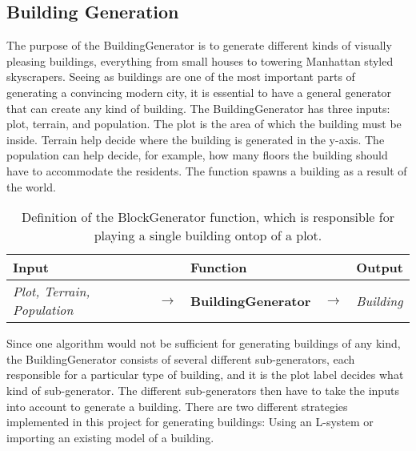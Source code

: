 \subsection{Building Generation}
The purpose of the BuildingGenerator is to generate different kinds of visually pleasing buildings, everything from small houses to towering Manhattan styled skyscrapers. 
Seeing as buildings are one of the most important parts of generating a convincing modern city, it is essential to have a general generator that can create any kind of building. 
The BuildingGenerator has three inputs: plot, terrain, and population. 
The plot is the area of which the building must be inside.
Terrain help decide where the building is generated in the y-axis. 
The population can help decide, for example, how many floors the building should have to accommodate the residents. 
The function spawns a building as a result of the world. 

\begin{table}[H]
    \centering
    \begin{tabular}{lllll}
      \textbf{Input}                           &               & \textbf{Function}            &               & \textbf{Output}         \\
      \midrule
      \textit{Plot, Terrain, Population}       & $\rightarrow$ & \textbf{BuildingGenerator}   & $\rightarrow$ & \textit{Building}       \\
      \bottomrule
    \end{tabular}
 
    \caption{Definition of the BlockGenerator function, which is responsible for playing a single building ontop of a plot.}
    \label{table:buildinggen}
  \end{table}
  \vspace{-0.4cm} 

Since one algorithm would not be sufficient for generating buildings of any kind, the BuildingGenerator consists of several different sub-generators, each responsible for a particular type of building, and it is the plot label decides what kind of sub-generator. 
The different sub-generators then have to take the inputs into account to generate a building.
There are two different strategies implemented in this project for generating buildings: Using an L-system or importing an existing model of a building. 

